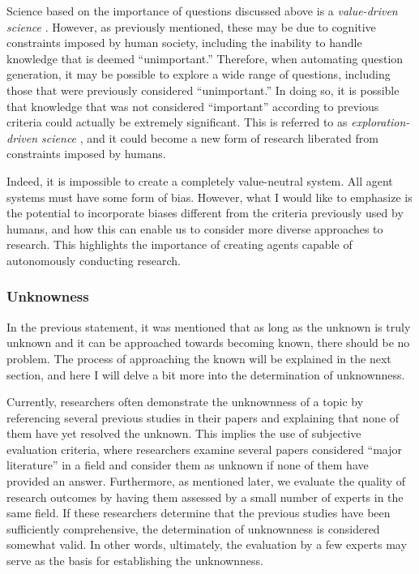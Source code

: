 \documentclass{book}
\begin{document}
Science based on the importance of questions discussed above is a \textit{value-driven science} \cite{kitano2021nobel}. However, as previously mentioned, these may be due to cognitive constraints imposed by human society, including the inability to handle knowledge that is deemed ``unimportant.'' Therefore, when automating question generation, it may be possible to explore a wide range of questions, including those that were previously considered ``unimportant.'' In doing so, it is possible that knowledge that was not considered ``important'' according to previous criteria could actually be extremely significant. This is referred to as \textit{exploration-driven science} \cite{kitano2021nobel}, and it could become a new form of research liberated from constraints imposed by humans. 

Indeed, it is impossible to create a completely value-neutral system. All agent systems must have some form of bias. However, what I would like to emphasize is the potential to incorporate biases different from the criteria previously used by humans, and how this can enable us to consider more diverse approaches to research. This highlights the importance of creating agents capable of autonomously conducting research.

\subsubsection{Unknowness}
In the previous statement, it was mentioned that as long as the unknown is truly unknown and it can be approached towards becoming known, there should be no problem. The process of approaching the known will be explained in the next section, and here I will delve a bit more into the determination of unknownness. 

Currently, researchers often demonstrate the unknownness of a topic by referencing several previous studies in their papers and explaining that none of them have yet resolved the unknown. This implies the use of subjective evaluation criteria, where researchers examine several papers considered ``major literature'' in a field and consider them as unknown if none of them have provided an answer. Furthermore, as mentioned later, we evaluate the quality of research outcomes by having them assessed by a small number of experts in the same field. If these researchers determine that the previous studies have been sufficiently comprehensive, the determination of unknownness is considered somewhat valid. In other words, ultimately, the evaluation by a few experts may serve as the basis for establishing the unknownness.
\end{document}
